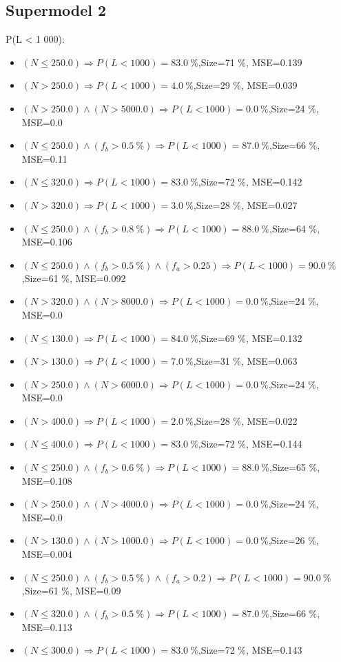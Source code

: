 \documentclass[numbered]{CSL}
\begin{document}
\subsection{Supermodel 2}
P(L < 1 000):
\begin{itemize}
\item $(N \leq 250.0) \Rightarrow P(L < 1 000) = 83.0~\%$,\hfill Size=71 \%, MSE=0.139
\item $(N > 250.0) \Rightarrow P(L < 1 000) = 4.0~\%$,\hfill Size=29 \%, MSE=0.039
\item $(N > 250.0) \land (N > 5000.0) \Rightarrow P(L < 1 000) = 0.0~\%$,\hfill Size=24 \%, MSE=0.0
\item $(N \leq 250.0) \land (f_b > 0.5~\%) \Rightarrow P(L < 1 000) = 87.0~\%$,\hfill Size=66 \%, MSE=0.11
\item $(N \leq 320.0) \Rightarrow P(L < 1 000) = 83.0~\%$,\hfill Size=72 \%, MSE=0.142
\item $(N > 320.0) \Rightarrow P(L < 1 000) = 3.0~\%$,\hfill Size=28 \%, MSE=0.027
\item $(N \leq 250.0) \land (f_b > 0.8~\%) \Rightarrow P(L < 1 000) = 88.0~\%$,\hfill Size=64 \%, MSE=0.106
\item $(N \leq 250.0) \land (f_b > 0.5~\%) \land (f_a > 0.25) \Rightarrow P(L < 1 000) = 90.0~\%$,\hfill Size=61 \%, MSE=0.092
\item $(N > 320.0) \land (N > 8000.0) \Rightarrow P(L < 1 000) = 0.0~\%$,\hfill Size=24 \%, MSE=0.0
\item $(N \leq 130.0) \Rightarrow P(L < 1 000) = 84.0~\%$,\hfill Size=69 \%, MSE=0.132
\item $(N > 130.0) \Rightarrow P(L < 1 000) = 7.0~\%$,\hfill Size=31 \%, MSE=0.063
\item $(N > 250.0) \land (N > 6000.0) \Rightarrow P(L < 1 000) = 0.0~\%$,\hfill Size=24 \%, MSE=0.0
\item $(N > 400.0) \Rightarrow P(L < 1 000) = 2.0~\%$,\hfill Size=28 \%, MSE=0.022
\item $(N \leq 400.0) \Rightarrow P(L < 1 000) = 83.0~\%$,\hfill Size=72 \%, MSE=0.144
\item $(N \leq 250.0) \land (f_b > 0.6~\%) \Rightarrow P(L < 1 000) = 88.0~\%$,\hfill Size=65 \%, MSE=0.108
\item $(N > 250.0) \land (N > 4000.0) \Rightarrow P(L < 1 000) = 0.0~\%$,\hfill Size=24 \%, MSE=0.0
\item $(N > 130.0) \land (N > 1000.0) \Rightarrow P(L < 1 000) = 0.0~\%$,\hfill Size=26 \%, MSE=0.004
\item $(N \leq 250.0) \land (f_b > 0.5~\%) \land (f_a > 0.2) \Rightarrow P(L < 1 000) = 90.0~\%$,\hfill Size=61 \%, MSE=0.09
\item $(N \leq 320.0) \land (f_b > 0.5~\%) \Rightarrow P(L < 1 000) = 87.0~\%$,\hfill Size=66 \%, MSE=0.113
\item $(N \leq 300.0) \Rightarrow P(L < 1 000) = 83.0~\%$,\hfill Size=72 \%, MSE=0.143
\end{itemize}
\end{document}
